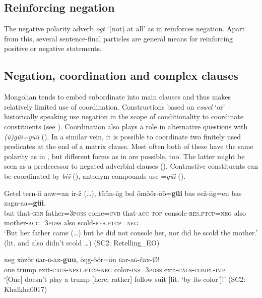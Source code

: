 \documentclass[output=paper,colorlinks,citecolor=brown,chinesefont]{langscibook}
\begin{document}
\subsection{Reinforcing negation}\label{sec:kha:4.4}
 
The negative polarity adverb \textit{ogt} ‘(not) at all’ as in  reinforces negation. Apart from this, several sentence-final particles are general means for reinforcing positive or negative statements.

\subsection{Negation, coordination and complex clauses}\label{sec:kha:4.5}

Mongolian tends to embed subordinate into main clauses and thus makes relatively limited use of coordination. Constructions based on \textit{eswel} ‘or’ historically speaking use negation in the scope of conditionality to coordinate constituents (see \citealt[89--90]{Brosig2015Negation}). Coordination also plays a role in alternative questions with \textit{(ü)güi=yüü} (). In a similar vein, it is possible to coordinate two finitely used predicates at the end of a matrix clause. Most often both of these have the same polarity as in , but different forms as in  are possible, too. The latter might be seen as a predecessor to negated adverbial clauses (). Contrastive constituents can be coordinated by \textit{biš} (), antonym compounds use =\textit{güi} (). 

\ea\label{ex:kha:78}
    \gll Getel tern-ii aaw=an ir-ž (…),   tüün-iig bol ömöör-öö=\textbf{güi} bas eež-iig=en bas  zagn-aa=\textbf{güi}. \\ %
         but that-\textsc{gen} father=\textsc{3poss} come=\textsc{cvb} {} that-\textsc{acc} \textsc{top} console-\textsc{res.ptcp=neg} also mother-\textsc{acc=3poss} also scold-\textsc{res.ptcp=neg}\\
    \glt ‘But her father came (…) but he did not console her, nor did he scold the mother.’ (lit. and also didn’t scold …) (SC2: Retelling\_EO)
\z 

\ea\label{ex:kha:79}
    \gll neg xözör ɢar-ɢ{}-ax-\textbf{guu}, öŋg-öör=ön ɢar-aɢ{}-čax-Ø!\\
         one trump exit-\textsc{caus-npst.ptcp-neg} color-\textsc{ins=3poss} exit-\textsc{caus-compl-imp}\\
    \glt ‘[One] doesn’t play a trump [here; rather] follow suit [lit. ‘by its color’]!’ (SC2: Khalkha0017) 
\z 
\end{document}
